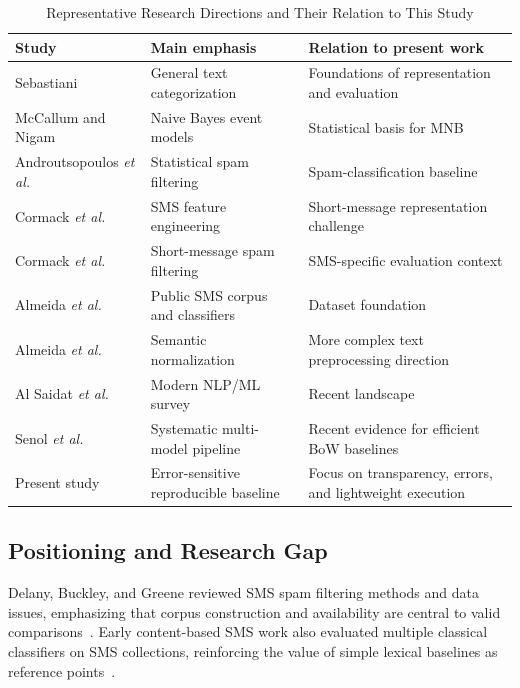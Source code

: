 \documentclass[conference]{IEEEtran}
\begin{document}
\begin{table}[t]
\caption{Representative Research Directions and Their Relation to This Study}
\label{tab:related}
\centering
\scriptsize
\begin{tabular}{p{1.55cm}p{2.35cm}p{2.75cm}}
\toprule
Study & Main emphasis & Relation to present work \\
\midrule
Sebastiani~\cite{sebastiani2002ml} & General text categorization & Foundations of representation and evaluation \\
McCallum and Nigam~\cite{mccallum1998nb} & Naive Bayes event models & Statistical basis for MNB \\
Androutsopoulos \textit{et al.}~\cite{androutsopoulos2000spam} & Statistical spam filtering & Spam-classification baseline \\
Cormack \textit{et al.}~\cite{cormack2007feature} & SMS feature engineering & Short-message representation challenge \\
Cormack \textit{et al.}~\cite{cormack2007spam} & Short-message spam filtering & SMS-specific evaluation context \\
Almeida \textit{et al.}~\cite{almeida2011sms} & Public SMS corpus and classifiers & Dataset foundation \\
Almeida \textit{et al.}~\cite{almeida2016normalization} & Semantic normalization & More complex text preprocessing direction \\
Al Saidat \textit{et al.}~\cite{saidat2024survey} & Modern NLP/ML survey & Recent landscape \\
Senol \textit{et al.}~\cite{senol2026pipeline} & Systematic multi-model pipeline & Recent evidence for efficient BoW baselines \\
Present study & Error-sensitive reproducible baseline & Focus on transparency, errors, and lightweight execution \\
\bottomrule
\end{tabular}
\end{table}

\subsection{Positioning and Research Gap}
Delany, Buckley, and Greene reviewed SMS spam filtering methods and data issues, emphasizing that corpus construction and availability are central to valid comparisons~\cite{delany2012methods}. Early content-based SMS work also evaluated multiple classical classifiers on SMS collections, reinforcing the value of simple lexical baselines as reference points~\cite{gomez2006content}.
\end{document}
